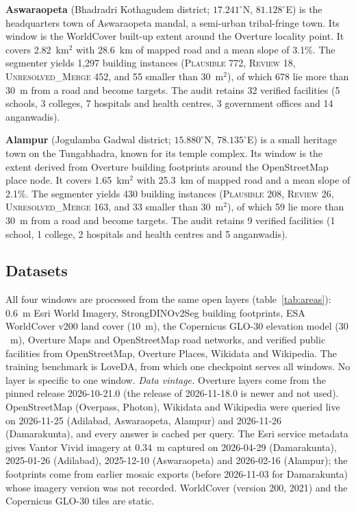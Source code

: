 \documentclass[10pt,a4paper,twocolumn]{article}
\newcommand{\dinoseg}{StrongDINOv2Seg}
\begin{document}
\textbf{Aswaraopeta} (Bhadradri Kothagudem district; $17.241^{\circ}$N, $81.128^{\circ}$E) is the headquarters town of Aswaraopeta mandal, a semi-urban tribal-fringe town. Its window is the WorldCover built-up extent around the Overture locality point.  It covers 2.82~km$^2$ with 28.6~km of mapped road and a mean slope of 3.1\%. The segmenter yields 1{,}297 building instances (\textsc{Plausible} 772, \textsc{Review} 18, \textsc{Unresolved\_Merge} 452, and 55 smaller than 30~m$^2$), of which 678 lie more than 30~m from a road and become targets. The audit retains 32 verified facilities (5 schools, 3 colleges, 7 hospitals and health centres, 3 government offices and 14 anganwadis). 

\textbf{Alampur} (Jogulamba Gadwal district; $15.880^{\circ}$N, $78.135^{\circ}$E) is a small heritage town on the Tungabhadra, known for its temple complex. Its window is the extent derived from Overture building footprints around the OpenStreetMap place node.  It covers 1.65~km$^2$ with 25.3~km of mapped road and a mean slope of 2.1\%. The segmenter yields 430 building instances (\textsc{Plausible} 208, \textsc{Review} 26, \textsc{Unresolved\_Merge} 163, and 33 smaller than 30~m$^2$), of which 59 lie more than 30~m from a road and become targets. The audit retains 9 verified facilities (1 school, 1 college, 2 hospitals and health centres and 5 anganwadis). 

\subsection{Datasets}
All four windows are processed from the same open layers (table~\ref{tab:areas}): 0.6~m Esri World Imagery, \dinoseg{} building footprints, ESA WorldCover v200 land cover ($10$~m), the Copernicus GLO-30 elevation model ($30$~m), Overture Maps and OpenStreetMap road networks, and verified public facilities from OpenStreetMap, Overture Places, Wikidata \cite{vrandecic2014wikidata} and Wikipedia. The training benchmark is LoveDA, from which one checkpoint serves all windows. No layer is specific to one window. \emph{Data vintage.} Overture layers come from the pinned release 2026-10-21.0 (the release of 2026-11-18.0 is newer and not used). OpenStreetMap (Overpass, Photon), Wikidata and Wikipedia were queried live on 2026-11-25 (Adilabad, Aswaraopeta, Alampur) and 2026-11-26 (Damarakunta), and every answer is cached per query. The Esri service metadata gives Vantor Vivid imagery at 0.34~m captured on 2026-04-29 (Damarakunta), 2025-01-26 (Adilabad), 2025-12-10 (Aswaraopeta) and 2026-02-16 (Alampur); the footprints come from earlier mosaic exports (before 2026-11-03 for Damarakunta) whose imagery version was not recorded. WorldCover (version 200, 2021) and the Copernicus GLO-30 tiles are static.
\end{document}

